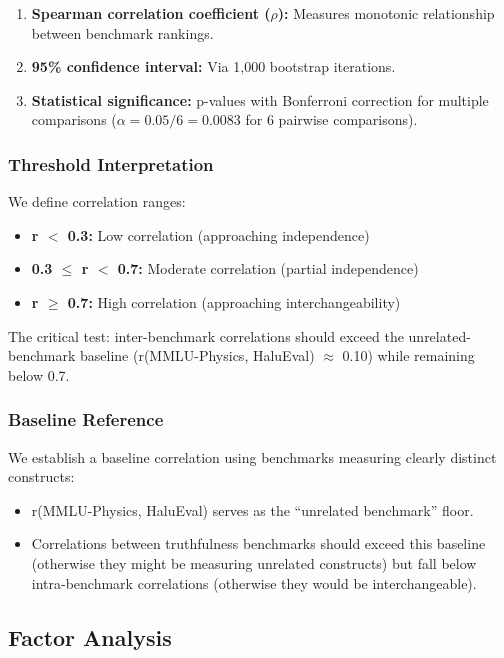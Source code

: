\begin{enumerate}
\item \textbf{Spearman correlation coefficient ($\rho$):} Measures monotonic relationship between benchmark rankings.
\item \textbf{95\% confidence interval:} Via 1,000 bootstrap iterations.
\item \textbf{Statistical significance:} p-values with Bonferroni correction for multiple comparisons ($\alpha = 0.05/6 = 0.0083$ for 6 pairwise comparisons).
\end{enumerate}

\subsubsection{Threshold Interpretation}

We define correlation ranges:
\begin{itemize}
\item \textbf{r $<$ 0.3:} Low correlation (approaching independence)
\item \textbf{0.3 $\leq$ r $<$ 0.7:} Moderate correlation (partial independence)
\item \textbf{r $\geq$ 0.7:} High correlation (approaching interchangeability)
\end{itemize}

The critical test: inter-benchmark correlations should exceed the unrelated-benchmark baseline (r(MMLU-Physics, HaluEval) $\approx$ 0.10) while remaining below 0.7.

\subsubsection{Baseline Reference}

We establish a baseline correlation using benchmarks measuring clearly distinct constructs:
\begin{itemize}
\item r(MMLU-Physics, HaluEval) serves as the ``unrelated benchmark'' floor.
\item Correlations between truthfulness benchmarks should exceed this baseline (otherwise they might be measuring unrelated constructs) but fall below intra-benchmark correlations (otherwise they would be interchangeable).
\end{itemize}

\subsection{Factor Analysis}

